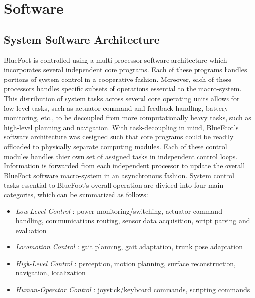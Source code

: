 \label{ch::software}
\chapter{Software}
	
	\section{System Software Architecture}
	
	BlueFoot is controlled using a multi-processor software architecture which incorporates several independent core programs. Each of these programs handles portions of system control in a cooperative fashion. Moreover, each of these processors handles specific subsets of operations essential to the macro-system. This distribution of system tasks across several core operating units allows for low-level tasks, such as actuator command and feedback handling, battery monitoring, etc., to be decoupled from more computationally heavy tasks, such as high-level planning and navigation. With task-decoupling in mind, BlueFoot's software architecture was designed such that core programs could be readily offloaded to physically separate computing modules. Each of these control modules handles thier own set of assigned tasks in independent control loops. Information is forwarded from each independent processor to update the overall BlueFoot software macro-system in an asynchronous fashion. System control tasks essential to BlueFoot's overall operation are divided into four main categories, which can be summarized as follows:
		\begin{itemize}
			\item{
			\emph{Low-Level Control} : 
				power monitoring/switching, 
				actuator command handling, 
				communications routing,
				sensor data acquisition,
				script parsing and evaluation
			}
			\item{
			\emph{Locomotion Control} : 
				gait planning, 
				gait adaptation, 
				trunk pose adaptation
			}
			\item{
			\emph{High-Level Control} : 
				perception, 
				motion planning, 
				surface reconstruction, 
				navigation, 
				localization
			}
			\item{
			\emph{Human-Operator Control} : 
				joystick/keyboard commands,
				scripting commands
			}
		\end{itemize}
